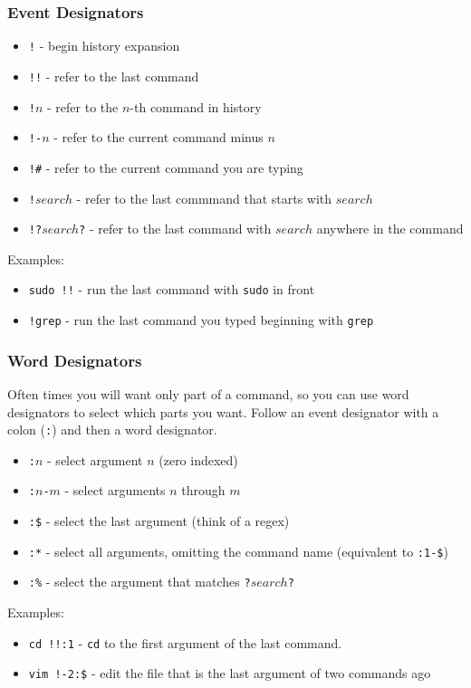 \documentclass[aspectratio=1610]{beamer}
\begin{document}
\begin{frame}
    \frametitle{Event Designators}
    \begin{itemize}[<+->]
        \item \texttt{!} - begin history expansion
        \item \texttt{!!} - refer to the last command
        \item \texttt{!$n$} - refer to the $n$-th command in history
        \item \texttt{!-$n$} - refer to the current command minus $n$
        \item \texttt{!\#} - refer to the current command you are typing
        \item \texttt{!$search$} - refer to the last commmand that starts with
            $search$
        \item[] \texttt{!?$search$?} - refer to the last command with $search$
            anywhere in the command
    \end{itemize}
    \pause[\thebeamerpauses]
    Examples:
    \begin{itemize}[<+->]
        \item \texttt{sudo !!} - run the last command with \texttt{sudo} in
            front
        \item \texttt{!grep} - run the last command you typed beginning with
            \texttt{grep}
    \end{itemize}
\end{frame}

\begin{frame}
    \frametitle{Word Designators}
    Often times you will want only part of a command, so you can use word
    designators to select which parts you want.\pause{} Follow an event designator with
    a colon (\texttt{:}) and then a word designator.
    \pause
    \begin{itemize}[<+->]
        \item \texttt{:$n$} - select argument $n$ (zero indexed)
        \item \texttt{:$n$-$m$} - select arguments $n$ through $m$
        \item \texttt{:\$} - select the last argument (think of a regex)
        \item \texttt{:*} - select all arguments, omitting the command name
            (equivalent to \texttt{:1-\$})
        \item[] \texttt{:\%} - select the argument that matches
                \texttt{?$search$?}
    \end{itemize}
    \pause[\thebeamerpauses]
    Examples:
    \begin{itemize}[<+->]
        \item \texttt{cd !!:1} - \texttt{cd} to the first argument of the last
            command.
        \item \texttt{vim !-2:\$} - edit the file that is the last argument of
            two commands ago
    \end{itemize}
\end{frame}
\end{document}
